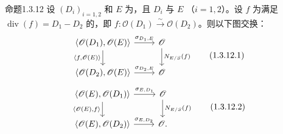 \begin{SGAresult}{命题}{1.3.12}
设 $(D_i)_{i=1,2}$ 和 $E$ 为，且 $D_i$ 与 $E$ （$i=1,2$）。设 $f$ 为满足 $\operatorname{div}(f)=D_1-D_2$ 的，即 $f:\mathscr O(D_1)\xrightarrow\sim\mathscr O(D_2)$。则以下图交换：
\begin{equation}\begin{tikzcd}\langle\mathscr O(D_1),\mathscr O(E)\rangle\ar[r,"{\sigma_{D_1,E}}"]\ar[d,"{\langle f,\mathscr O(E)\rangle}"']&\mathscr O\ar[d,"{N_{E/S}(f)}"]\\\langle\mathscr O(D_2),\mathscr O(E)\rangle\ar[r,"{\sigma_{D_2,E}}"]&\mathscr O\end{tikzcd}\tag{1.3.12.1}\end{equation}
\begin{equation}\begin{tikzcd}\langle\mathscr O(E),\mathscr O(D_1)\rangle\ar[r,"{\sigma_{E,D_1}}"]\ar[d,"{\langle\mathscr O(E),f\rangle}"']&\mathscr O\ar[d,"{N_{E/S}(f)}"]\\\langle\mathscr O(E),\mathscr O(D_2)\rangle\ar[r,"{\sigma_{E,D_2}}"]&\mathscr O.\end{tikzcd}\tag{1.3.12.2}\end{equation}
\end{SGAresult}
